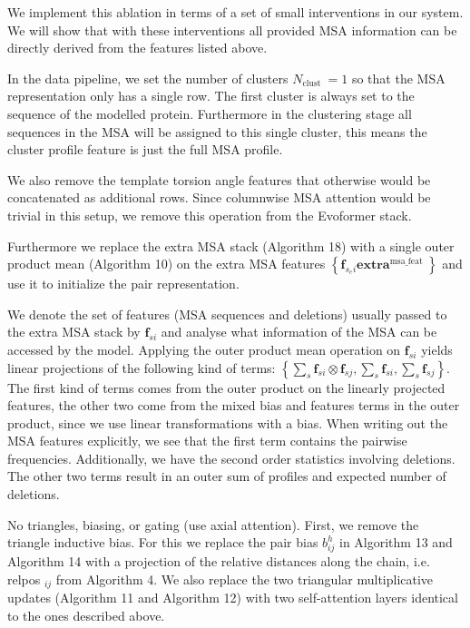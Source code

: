 \documentclass[10pt]{article}
\begin{document}
We implement this ablation in terms of a set of small interventions in our system. We will show that with these interventions all provided MSA information can be directly derived from the features listed above.

In the data pipeline, we set the number of clusters $N_{\text {clust }}=1$ so that the MSA representation only has a single row. The first cluster is always set to the sequence of the modelled protein. Furthermore in the clustering stage all sequences in the MSA will be assigned to this single cluster, this means the cluster profile feature is just the full MSA profile.

We also remove the template torsion angle features that otherwise would be concatenated as additional rows. Since columnwise MSA attention would be trivial in this setup, we remove this operation from the Evoformer stack.

Furthermore we replace the extra MSA stack (Algorithm 18) with a single outer product mean (Algorithm 10) on the extra MSA features $\left\{\mathbf{f}_{s_{e} i} \mathbf{e x t r a}^{\text {msa_feat }}\right\}$ and use it to initialize the pair representation.

We denote the set of features (MSA sequences and deletions) usually passed to the extra MSA stack by $\mathbf{f}_{s i}$ and analyse what information of the MSA can be accessed by the model. Applying the outer product mean operation on $\mathbf{f}_{s i}$ yields linear projections of the following kind of terms: $\left\{\sum_{s} \mathbf{f}_{s i} \otimes \mathbf{f}_{s j}, \sum_{s} \mathbf{f}_{s i}, \sum_{s} \mathbf{f}_{s j}\right\}$. The first kind of terms comes from the outer product on the linearly projected features, the other two come from the mixed bias and features terms in the outer product, since we use linear transformations with a bias. When writing out the MSA features explicitly, we see that the first term contains the pairwise frequencies. Additionally, we have the second order statistics involving deletions. The other two terms result in an outer sum of profiles and expected number of deletions.

No triangles, biasing, or gating (use axial attention). First, we remove the triangle inductive bias. For this we replace the pair bias $b_{i j}^{h}$ in Algorithm 13 and Algorithm 14 with a projection of the relative distances along the chain, i.e. relpos $_{i j}$ from Algorithm 4. We also replace the two triangular multiplicative updates (Algorithm 11 and Algorithm 12) with two self-attention layers identical to the ones described above.
\end{document}
